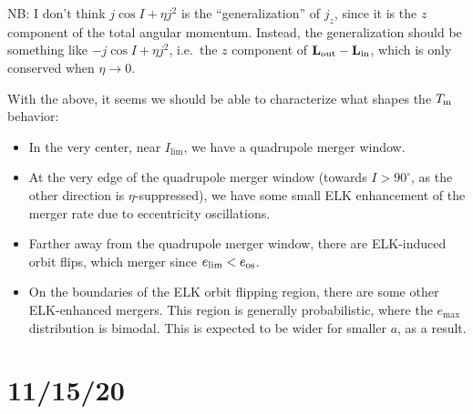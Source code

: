 \documentclass[11pt,
        usenames, %
        dvipsnames %
    ]{article}
\newcommand*{\bm}[1]{\boldsymbol{\mathbf{#1}}}
\begin{document}
\begin{itemize}
        NB\@: I don't think $j \cos I + \eta j^2$ is the ``generalization'' of
        $j_z$, since it is the $z$ component of the total angular momentum.
        Instead, the generalization should be something like $-j\cos I + \eta
        j^2$, i.e.\ the $z$ component of $\bm{L}_{\rm out} - \bm{L}_{\rm in}$,
        which is only conserved when $\eta \to 0$.
\end{itemize}

With the above, it seems we should be able to characterize what shapes the
$T_{\rm m}$ behavior:
\begin{itemize}
    \item In the very center, near $I_{\lim}$, we have a quadrupole merger
        window.

    \item At the very edge of the quadrupole merger window (towards $I >
        90^\circ$, as the other direction is $\eta$-suppressed), we have some
        small ELK enhancement of the merger rate due to eccentricity
        oscillations.

    \item Farther away from the quadrupole merger window, there are ELK-induced
        orbit flips, which merger since $e_{\lim} < e_{\rm os}$.

    \item On the boundaries of the ELK orbit flipping region, there are some
        other ELK-enhanced mergers. This region is generally probabilistic,
        where the $e_{\max}$ distribution is bimodal. This is expected to be
        wider for smaller $a$, as a result.
\end{itemize}

\section{11/15/20}
\end{document}
